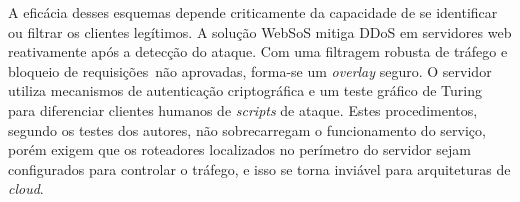 A eficácia desses esquemas depende criticamente da capacidade de se identificar ou filtrar os clientes legítimos. 
%
A solução WebSoS \cite{Stavrou:2005:WOS:1090583.1648614} mitiga DDoS em servidores web reativamente após a detecção do ataque. Com uma filtragem robusta de tráfego e bloqueio de requisições~não aprovadas, forma-se um \emph{overlay} seguro. O servidor utiliza mecanismos de autenticação criptográfica e um teste gráfico de Turing \cite{Dietrich00analyzingdistributed} para diferenciar clientes humanos de \emph{scripts} de ataque. Estes procedimentos, segundo os testes dos autores, não sobrecarregam o funcionamento do serviço, porém exigem que os roteadores localizados no perímetro do servidor sejam configurados para controlar o tráfego, e isso se torna inviável para arquiteturas de \emph{cloud}.
